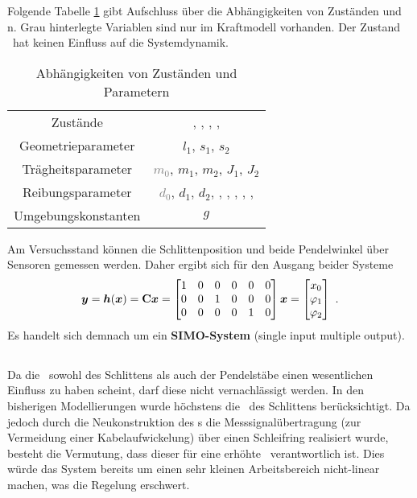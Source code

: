 Folgende Tabelle \ref{tab:abh} gibt Aufschluss über die Abhängigkeiten von Zuständen und \syp n. 
Grau hinterlegte Variablen sind nur im Kraftmodell vorhanden. 
Der Zustand \xo\ hat keinen Einfluss auf die Systemdynamik.
\begin{table}[h]
	\centering
		\begin{tabular}[t]{cc}
		\toprule
			Zustände	&	\textcolor{grey}{\xop}, \phe, \phep, \phz, \phzp	\\
			Geometrieparameter	&	$l_1$, $s_1$, $s_2$	\\
			Trägheitsparameter	&	\textcolor{grey}{$m_0$}, $m_1$, $m_2$, $J_1$, $J_2$ \\
			Reibungsparameter	&	\textcolor{grey}{$d_0$}, $d_1$, $d_2$, \textcolor{grey}{\Fco}, \Mceo, \Mczo, \textcolor{grey}{\xopth}, \pheth, \phzth	\\
			Umgebungskonstanten & $g$	\\
			\bottomrule
		\end{tabular}
	\caption{Abhängigkeiten von Zuständen und Parametern}
	\label{tab:abh}
\end{table}


Am Versuchsstand können die Schlittenposition und beide Pendelwinkel über Sensoren gemessen werden. Daher ergibt sich für den Ausgang beider Systeme
\begin{align}
	\boldsymbol{y} = \boldsymbol{h}(\boldsymbol{x})
	= {\boldsymbol{\mathrm{C}}} \boldsymbol{x}
	= \begin{bmatrix}
		1 & 0 & 0 & 0 & 0 & 0 \\
		0 & 0 & 1 & 0 & 0 & 0 \\
		0 & 0 & 0 & 0 & 1 & 0 
	\end{bmatrix} \boldsymbol{x}
	= \begin{bmatrix}
		x_0 \\ \varphi_1 \\ \varphi_2
	\end{bmatrix}  \ .
	\label{eq:hx}
\end{align}
Es handelt sich demnach um ein \textbf{SIMO-System} (single input multiple output). 


\subsection{\crb}\label{sec:crb}

Da die \crb\ sowohl des Schlittens als auch der Pendelstäbe einen wesentlichen Einfluss zu haben scheint, darf diese nicht vernachlässigt werden. 
In den bisherigen Modellierungen wurde höchstens die \crb\ des Schlittens berücksichtigt. 
Da jedoch durch die Neukonstruktion des \dpd s die Messsignalübertragung (zur Vermeidung einer Kabelaufwickelung) über einen Schleifring realisiert wurde, besteht die Vermutung, dass dieser für eine erhöhte \crb\ verantwortlich ist. 
Dies würde das System bereits um einen sehr kleinen Arbeitsbereich nicht-linear machen, was die Regelung erschwert.

